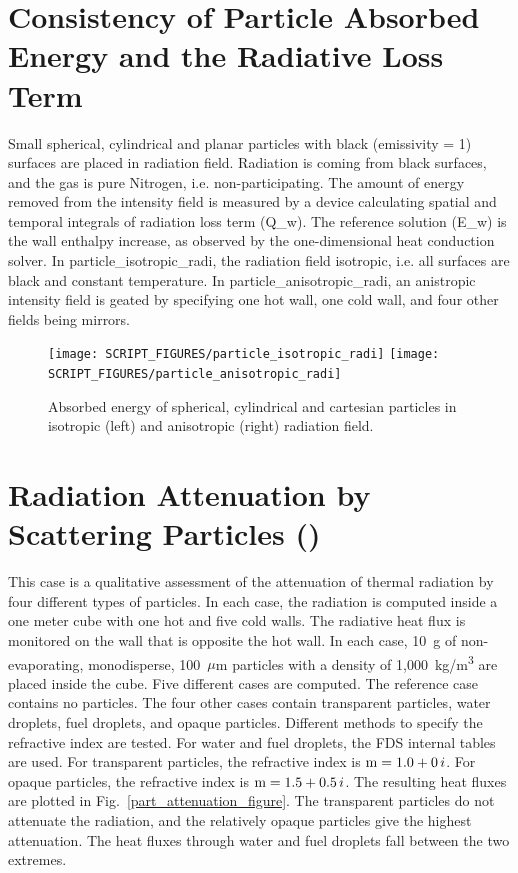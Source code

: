 \documentclass[11pt]{book}
\begin{document}
\section{Consistency of Particle Absorbed Energy and the Radiative Loss Term}
\label{particle_isotropic_radi}
\label{particle_anisotropic_radi}

Small spherical, cylindrical and planar particles with black (emissivity = 1) surfaces are placed in radiation field. Radiation is coming from black surfaces, and the gas is pure Nitrogen, i.e. non-participating. The amount of energy removed from the intensity field is measured by a device calculating spatial and temporal integrals of radiation loss term (Q\_w).  The reference solution (E\_w) is the wall enthalpy increase, as observed by the one-dimensional heat conduction solver.
In {\ct particle\_isotropic\_radi}, the radiation field isotropic, i.e. all surfaces are black and constant temperature. In {\ct particle\_anisotropic\_radi}, an anistropic intensity field is geated by specifying one hot wall, one cold wall, and four other fields being mirrors.

\begin{figure}[ht]
\texttt{[image: SCRIPT\_FIGURES/particle\_isotropic\_radi]}
\texttt{[image: SCRIPT\_FIGURES/particle\_anisotropic\_radi]}
\caption[The {\ct particle\_isotropic\_radi} and {\ct particle\_anisotropic\_radi} test cases]{Absorbed energy of spherical, cylindrical and cartesian particles in isotropic (left) and anisotropic (right) radiation field.}
\label{particle_an_isotropic_radiation_figs}
\end{figure}


\section{Radiation Attenuation by Scattering Particles (\texorpdfstring{}{part\_attenuation}) }
\label{part_attenuation}

This case is a qualitative assessment of the attenuation of thermal radiation by four different types of particles. In each case, the radiation is computed inside a one meter cube with one hot and five cold walls. The radiative heat flux is monitored on the wall that is opposite the hot wall. In each case, 10~g of non-evaporating, monodisperse, 100~$\mu$m particles with a density of 1,000~\si{kg/m^3} are placed inside the cube. Five different cases are computed. The reference case contains no particles. The four other cases contain transparent particles, water droplets, fuel droplets, and opaque particles. Different methods to specify the refractive index are tested. For water and fuel droplets, the FDS internal tables are used. For transparent particles, the refractive index is $\hbox{m} = 1.0+0\,i$. For opaque particles, the refractive index is $\hbox{m} = 1.5+0.5 \,i$. The resulting heat fluxes are plotted in Fig.~\ref{part_attenuation_figure}. The transparent particles do not attenuate the radiation, and the relatively opaque particles give the highest attenuation. The heat fluxes through water and fuel droplets fall between the two extremes.
\end{document}
